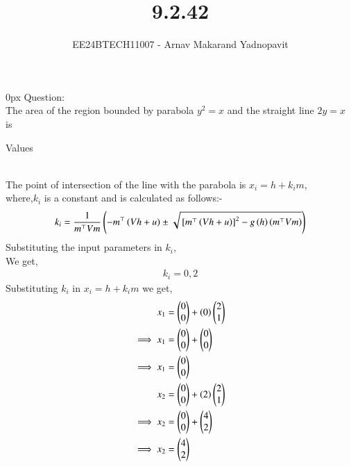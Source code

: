 \documentclass[journal]{IEEEtran}
\begin{document}

\title{9.2.42}
\author{EE24BTECH11007 - Arnav Makarand Yadnopavit}
{\let\newpage\relax\maketitle}
\renewcommand{\thefigure}{\theenumi}
\renewcommand{\thetable}{\theenumi}
\setlength{\intextsep}{10pt} %
\renewcommand{\thetable}{\theenumi}
\parindent 0px
Question:\\
The area of the region bounded by parabola $y^2 = x$ and the straight line $2y = x$ is\\
\solution
\begin{table}[h]
    \centering
    
    \caption{Values}
    \label{tab:1}
\end{table}\\
The point of intersection of the line with the parabola is $x_i=h+k_i m$,\\
where,$k_i$ is a constant and is calculated as follows:-
\begin{align}
    k_i=\frac{1}{m^\top Vm}\left(-m^\top \left(Vh+u\right)\pm \sqrt{{}\left[m^\top \left(Vh+u\right)\right]^2-g\left(h\right)\left(m^\top Vm\right)}\right)
\end{align}
Substituting the input parameters in $k_i$,\\
We get,\\
\begin{align}
    k_i= 0, 2
\end{align}
Substituting $k_i$ in $x_i=h+k_i m$  we get,\\
\begin{align}
     x_1&=\begin{pmatrix}0\\0\end{pmatrix}+\left(0\right)\begin{pmatrix}2\\1\end{pmatrix}\\
    \implies x_1 &=\begin{pmatrix}0\\0\end{pmatrix} + \begin{pmatrix}0\\0\end{pmatrix}\\
    \implies x_1 &=\begin{pmatrix}0\\0\end{pmatrix}\\
    x_2 &=\begin{pmatrix}0\\0\end{pmatrix}+\left(2\right)\begin{pmatrix}2\\1\end{pmatrix}\\
    \implies x_2&=\begin{pmatrix}0\\0\end{pmatrix}+\begin{pmatrix}4\\2\end{pmatrix}\\
    \implies x_2&=\begin{pmatrix}4\\2\end{pmatrix}
\end{align}
\end{document}
